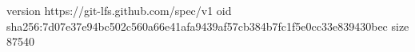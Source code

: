 version https://git-lfs.github.com/spec/v1
oid sha256:7d07e37e94bc502c560a66e41afa9439af57cb384b7fc1f5e0cc33e839430bec
size 87540
